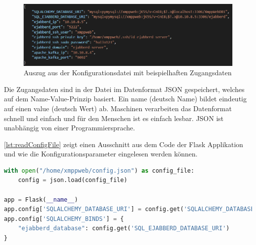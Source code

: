 \documentclass[a4paper,titlepage,halfparskip,12pt]{scrreprt}
\begin{document}
\begin{onehalfspacing}
\begin{figure}[h]
	\centering
	\includegraphics[width=\linewidth]{images/configJSON-Datei}
	\caption{Auszug aus der Konfigurationsdatei mit beispielhaften Zugangsdaten}
	\label{img:configJSON-Datei}
\end{figure}

Die Zugangsdaten sind in der Datei im Datenformat \ac{JSON} gespeichert, welches auf dem Name-Value-Prinzip basiert. Ein name (deutsch Name) bildet eindeutig auf einen value (deutsch Wert) ab. Maschinen verarbeiten das Datenformat schnell und einfach und für den Menschen ist es einfach lesbar. \ac{JSON} ist unabhängig von einer Programmiersprache.\cite{jsonIntroduction}

\autoref{lst:readConfigFile} zeigt einen Ausschnitt aus dem Code der Flask Applikation und wie die Konfigurationsparameter eingelesen werden können.

\bigskip

\begin{lstlisting}[language=python, caption={Auslesen der Konfigurationsparameter aus einer Datei}, label={lst:readConfigFile}]
with open("/home/xmppweb/config.json") as config_file:
    config = json.load(config_file)

app = Flask(__name__)
app.config['SQLALCHEMY_DATABASE_URI'] = config.get('SQLALCHEMY_DATABASE_URI')
app.config['SQLALCHEMY_BINDS'] = {
    "ejabberd_database": config.get('SQL_EJABBERD_DATABASE_URI')
}
\end{lstlisting}


\end{onehalfspacing}
\end{document}
